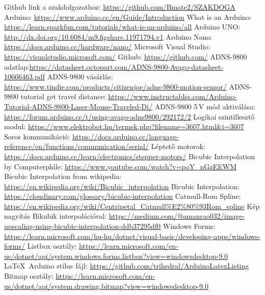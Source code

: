 \documentclass[]{thesis-ekf}
\theoremstyle{definition}
\theoremstyle{remark}
\begin{document}
\begin{thebibliography}{9}
 Github link a szakdolgozathoz: \url{https://github.com/Bmate2/SZAKDOGA}
 Arduino: \url{https://www.arduino.cc/en/Guide/Introduction}
 What is an Arduino: \url{https://learn.sparkfun.com/tutorials/what-is-an-arduino/all}
 Arduino UNO: \url{http://dx.doi.org/10.6084/m9.figshare.11971794.v1}
 Arduino Nano: \url{https://docs.arduino.cc/hardware/nano/}
 Microsoft Visual Studio: \url{https://visualstudio.microsoft.com/}
 Github: \url{https://github.com/}
 ADNS-9800 adatlap:\url{https://datasheet.octopart.com/ADNS-9800-Avago-datasheet-10666463.pdf}
 ADNS-9800 vásárlás: \url{https://www.tindie.com/products/citizenjoe/adns-9800-motion-sensor/}
 ADNS-9800 tutorial get travel distance: \url{https://www.instructables.com/Arduino-Tutorial-ADNS-9800-Laser-Mouse-Traveled-Di/}
 ADNS-9800 5\,V mód aktiválása: \url{https://forum.arduino.cc/t/using-avago-adns9800/292172/2}
 Logikai szintillesztő modul: \url{https://www.elektrobot.hu/termek.php?filename=3607.html&i=3607}
 Soros kommunikáció: \url{https://docs.arduino.cc/language-reference/en/functions/communication/serial/}
 Léptető motorok: \url{https://docs.arduino.cc/learn/electronics/stepper-motors/}
 Bicubic Interpolation by Computerphile: \url{https://www.youtube.com/watch?v=poY_nGzEEWM}
 Bicubic Interpolation from wikipedia: \url{https://en.wikipedia.org/wiki/Bicubic_interpolation}
 Bicubic Interpolation: \url{https://cloudinary.com/glossary/bicubic-interpolation}
 Catmull-Rom Spline: \url{https://en.wikipedia.org/wiki/Centripetal_Catmull%E2%80%93Rom_spline}
 Kép nagyítás Bikubik interpolációval: \url{https://medium.com/@amanrao032/image-upscaling-using-bicubic-interpolation-ddb37295df0}
 Windows Forms: \url{https://learn.microsoft.com/hu-hu/dotnet/visual-basic/developing-apps/windows-forms/}
 Listbox osztály: \url{https://learn.microsoft.com/en-us/dotnet/api/system.windows.forms.listbox?view=windowsdesktop-9.0}
 \LaTeX\ Arduino stílus fájl: \url{https://github.com/trihedral/ArduinoLatexListing}
 Bitmap osztály: \url{https://learn.microsoft.com/en-us/dotnet/api/system.drawing.bitmap?view=windowsdesktop-9.0}

\end{thebibliography}
\end{document}
